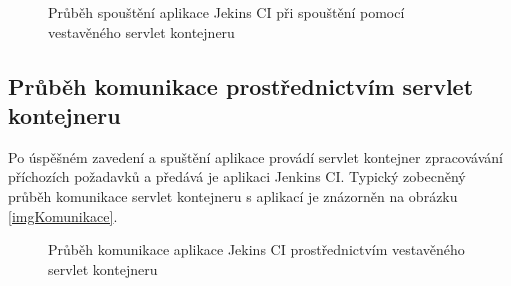             \begin{figure}[h!t]
                \begin{center}
                    \caption{Průběh spouštění aplikace Jekins CI při spouštění pomocí vestavěného servlet kontejneru}
                    \label{imgArchitekturaSpusteni}
                \end{center}
            \end{figure}


        \subsection{Průběh komunikace prostřednictvím servlet kontejneru}
            Po úspěšném zavedení a spuštění aplikace provádí servlet kontejner
            zpracovávání příchozích požadavků a předává je aplikaci Jenkins CI. 
            Typický zobecněný průběh komunikace servlet kontejneru s aplikací je znázorněn
            na obrázku \ref{imgKomunikace}. 

            \begin{figure}[h!t]
                \begin{center}
                    \caption{Průběh komunikace aplikace Jekins CI prostřednictvím vestavěného servlet kontejneru}
                    \label{imgArchitekturaSpusteni}
                \end{center}
            \end{figure}

